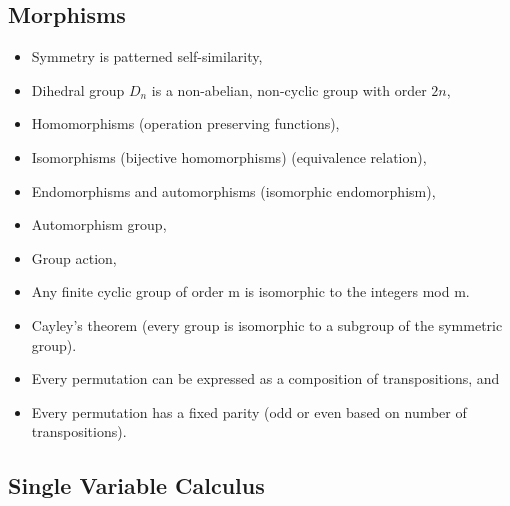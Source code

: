 \hypertarget{morphisms}{%
\subsection{Morphisms}\label{morphisms}}

\begin{itemize}
\tightlist
\item
  Symmetry is patterned self-similarity,
\item
  Dihedral group \(D_n\) is a non-abelian, non-cyclic group with order
  \(2n\),
\item
  Homomorphisms (operation preserving functions),
\item
  Isomorphisms (bijective homomorphisms) (equivalence relation),
\item
  Endomorphisms and automorphisms (isomorphic endomorphism),
\item
  Automorphism group,
\item
  Group action,
\item
  Any finite cyclic group of order m is isomorphic to the integers mod
  m.
\item
  Cayley's theorem (every group is isomorphic to a subgroup of the
  symmetric group).
\item
  Every permutation can be expressed as a composition of transpositions,
  and
\item
  Every permutation has a fixed parity (odd or even based on number of
  transpositions).
\end{itemize}

\hypertarget{single-variable-calculus}{%
\subsection{Single Variable Calculus}\label{single-variable-calculus}}

